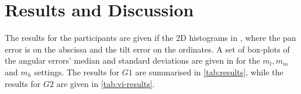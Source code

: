 \documentclass[sigconf, screen=true, anonymous=true]{acmart}
\begin{document}




\section{Results and Discussion}\label{sec:results}

The results for the participants are given if the 2D histograms in , where the pan error is on the abscissa and the tilt error on the ordinates.
A set of box-plots of the angular errors' median and standard deviations are given in  for the $m_l, m_m$ and $m_h$ settings. 
The results for $G1$ are summarised in \cref{tab:results}, while the results for $G2$ are given in \cref{tab:vi-results}.
\end{document}

